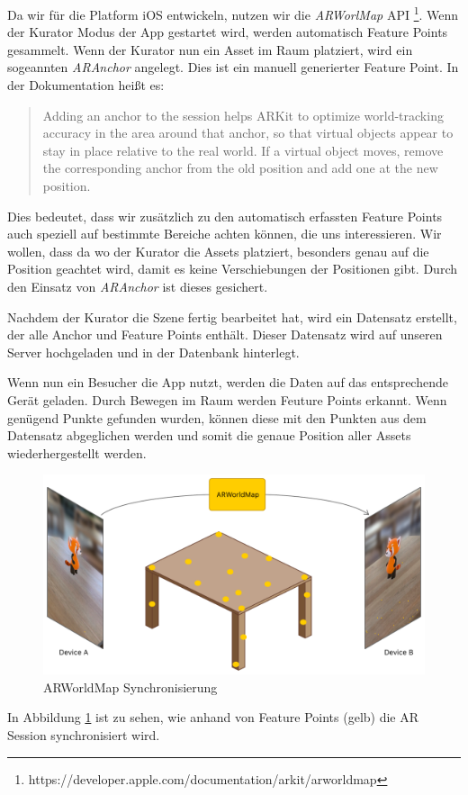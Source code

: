 \documentclass[titlepage, a4paper, 11pt]{scrartcl}
\begin{document}
    Da wir für die Platform iOS entwickeln, nutzen wir die \textit{ARWorlMap} API \footnote{https://developer.apple.com/documentation/arkit/arworldmap}.
    Wenn der Kurator Modus der App gestartet wird, werden automatisch Feature Points gesammelt.
    Wenn der Kurator nun ein Asset im Raum platziert, wird ein sogeannten \textit{ARAnchor} angelegt. Dies ist ein manuell generierter Feature Point.
    In der Dokumentation heißt es: 
    \begin{quote}
      Adding an anchor to the session helps ARKit to optimize world-tracking accuracy in the area around that anchor, so that virtual objects appear to stay in place relative to the real world. If a virtual object moves, remove the corresponding anchor from the old position and add one at the new position.
    \end{quote}
    Dies bedeutet, dass wir zusätzlich zu den automatisch erfassten Feature Points auch speziell auf bestimmte Bereiche achten können, die uns interessieren.
    Wir wollen, dass da wo der Kurator die Assets platziert, besonders genau auf die Position geachtet wird, damit es keine Verschiebungen der Positionen gibt.
    Durch den Einsatz von \textit{ARAnchor} ist dieses gesichert.

    Nachdem der Kurator die Szene fertig bearbeitet hat, wird ein Datensatz erstellt, der alle Anchor und Feature Points enthält.
    Dieser Datensatz wird auf unseren Server hochgeladen und in der Datenbank hinterlegt.

    Wenn nun ein Besucher die App nutzt, werden die Daten auf das entsprechende Gerät geladen.
    Durch Bewegen im Raum werden Feuture Points erkannt. Wenn genügend Punkte gefunden wurden, können diese mit den Punkten aus dem Datensatz abgeglichen werden und somit die genaue Position aller Assets wiederhergestellt werden.


    \begin{figure}[h]
      \centering
      \includegraphics[width=.5\textwidth]{ar-world-map}
      \caption{ARWorldMap Synchronisierung}
      \label{ARWorldMap}
    \end{figure}

    In Abbildung \ref{ARWorldMap} ist zu sehen, wie anhand von Feature Points (gelb) die AR Session synchronisiert wird.
\end{document}
